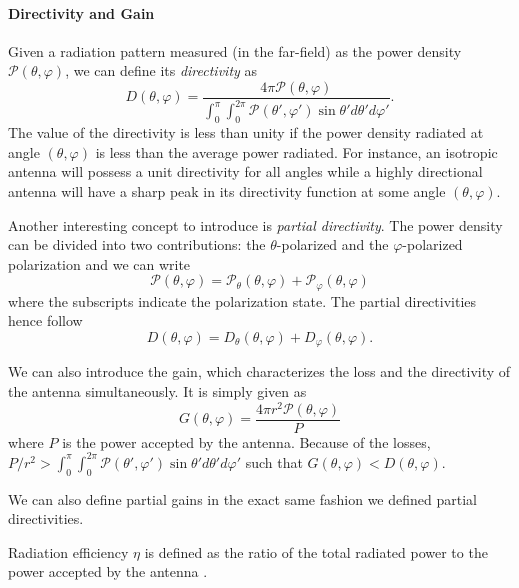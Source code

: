 \paragraph[Directivity and Gain]{Directivity and Gain \cite[\S 1.16]{ELL2003}}
Given a radiation pattern measured (in the far-field) as the power density 
$\mathcal{P}(\theta,\varphi)$, we can define its \textit{directivity}
as
  \begin{equation}
   D(\theta,\varphi) = \frac{4\pi\mathcal{P}(\theta,\varphi)}
			{\int_0^\pi\int_0^{2\pi}\mathcal{P}(\theta',\varphi')\sin\theta'd\theta'd\varphi'}.
  \end{equation}
The value of the directivity is less than unity if the power density radiated at angle $(\theta,\varphi)$
is less than the average power radiated. For instance, an isotropic antenna will possess a unit directivity
for all angles while a highly directional antenna will have a sharp peak  in its directivity function 
at some angle $(\theta,\varphi)$.

Another interesting concept to introduce is \textit{partial directivity}. 
The power density can be divided into two contributions: the $\theta$-polarized
and the $\varphi$-polarized polarization and we can write
  \begin{equation}
    \mathcal{P}(\theta,\varphi) = \mathcal{P}_\theta(\theta,\varphi)+\mathcal{P}_\varphi(\theta,\varphi)
  \end{equation}
where the subscripts indicate the polarization state. The partial 
directivities hence follow
  \begin{equation}
   D(\theta,\varphi) = D_\theta(\theta,\varphi)+D_\varphi(\theta,\varphi).
  \end{equation}

We can also introduce the gain, which characterizes the loss
and the directivity of the antenna simultaneously. It is simply given
as
  \begin{equation}
    G(\theta,\varphi) = \frac{4\pi r^2\mathcal{P}(\theta,\varphi)}{P}
  \end{equation}
where $P$ is the power accepted by the antenna. Because of the 
losses, $P/r^2>\int_0^\pi\int_0^{2\pi}\mathcal{P}(\theta',\varphi')\sin\theta'd\theta'd\varphi'$
such that $G(\theta,\varphi)<D(\theta,\varphi)$. 

We can also define partial gains in the exact same fashion we defined partial
directivities.

Radiation efficiency $\eta$ is defined as the ratio of the total radiated power 
to the power accepted by the antenna \cite{IEEE145-1993}.


